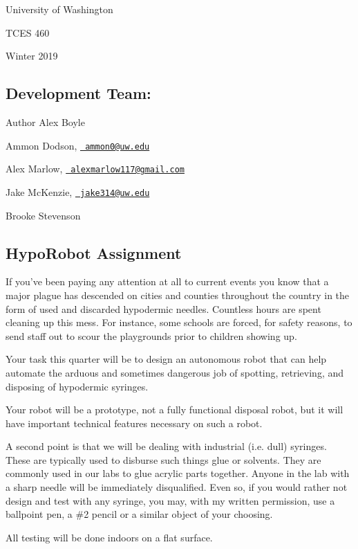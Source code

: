 University of Washington

T\+C\+ES 460

Winter 2019\hypertarget{index_autotoc_md1}{}\subsection{Development Team\+:}\label{index_autotoc_md1}
\begin{DoxyAuthor}{Author}
Alex Boyle 

Ammon Dodson, \href{mailto:ammon0@uw.edu}{\texttt{ ammon0@uw.\+edu}} 

Alex Marlow, \href{mailto:alexmarlow117@gmail.com}{\texttt{ alexmarlow117@gmail.\+com}} 

Jake Mc\+Kenzie, \href{mailto:jake314@uw.edu}{\texttt{ jake314@uw.\+edu}} 

Brooke Stevenson
\end{DoxyAuthor}
\hypertarget{index_autotoc_md2}{}\subsection{Hypo\+Robot Assignment}\label{index_autotoc_md2}
If you’ve been paying any attention at all to current events you know that a major plague has descended on cities and counties throughout the country in the form of used and discarded hypodermic needles. Countless hours are spent cleaning up this mess. For instance, some schools are forced, for safety reasons, to send staff out to scour the playgrounds prior to children showing up.

Your task this quarter will be to design an autonomous robot that can help automate the arduous and sometimes dangerous job of spotting, retrieving, and disposing of hypodermic syringes.

Your robot will be a prototype, not a fully functional disposal robot, but it will have important technical features necessary on such a robot.

A second point is that we will be dealing with industrial (i.\+e. dull) syringes. These are typically used to disburse such things glue or solvents. They are commonly used in our labs to glue acrylic parts together. Anyone in the lab with a sharp needle will be immediately disqualified. Even so, if you would rather not design and test with any syringe, you may, with my written permission, use a ballpoint pen, a \#2 pencil or a similar object of your choosing.

All testing will be done indoors on a flat surface. 